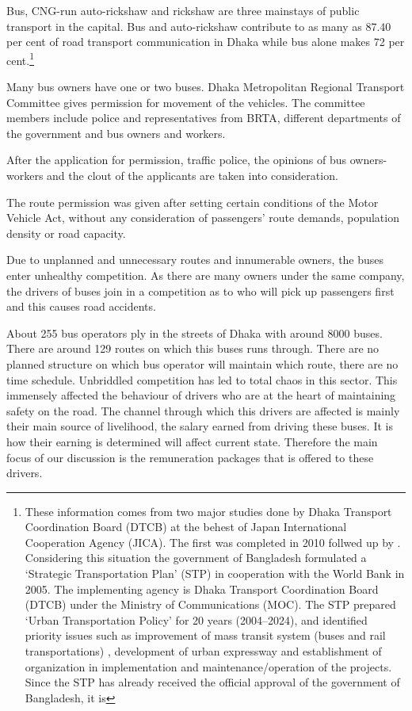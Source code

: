 \documentclass[11pt,]{article}
\begin{document}
Bus, CNG-run auto-rickshaw and rickshaw are three mainstays of public
transport in the capital. Bus and auto-rickshaw contribute to as many as
87.40 per cent of road transport communication in Dhaka while bus alone
makes 72 per cent.\footnote{These information comes from two major
  studies done by Dhaka Transport Coordination Board (DTCB) at the
  behest of Japan International Cooperation Agency (JICA). The first was
  completed in 2010 \autocite{dtcb_preparatory_2010} follwed up by
  \autocite{dtcb_preparatory_2011}. Considering this situation the
  government of Bangladesh formulated a `Strategic Transportation Plan'
  (STP) in cooperation with the World Bank in 2005. The implementing
  agency is Dhaka Transport Coordination Board (DTCB) under the Ministry
  of Communications (MOC). The STP prepared `Urban Transportation
  Policy' for 20 years (2004--2024), and identified priority issues such
  as improvement of mass transit system (buses and rail transportations)
  , development of urban expressway and establishment of organization in
  implementation and maintenance/operation of the projects. Since the
  STP has already received the official approval of the government of
  Bangladesh, it is}

Many bus owners have one or two buses. Dhaka Metropolitan Regional
Transport Committee gives permission for movement of the vehicles. The
committee members include police and representatives from BRTA,
different departments of the government and bus owners and workers.

After the application for permission, traffic police, the opinions of
bus owners-workers and the clout of the applicants are taken into
consideration.

The route permission was given after setting certain conditions of the
Motor Vehicle Act, without any consideration of passengers' route
demands, population density or road capacity.

Due to unplanned and unnecessary routes and innumerable owners, the
buses enter unhealthy competition. As there are many owners under the
same company, the drivers of buses join in a competition as to who will
pick up passengers first and this causes road accidents.

About 255 bus operators ply in the streets of Dhaka with around 8000
buses. There are around 129 routes on which this buses runs through.
There are no planned structure on which bus operator will maintain which
route, there are no time schedule. Unbriddled competition has led to
total chaos in this sector. This immensely affected the behaviour of
drivers who are at the heart of maintaining safety on the road. The
channel through which this drivers are affected is mainly their main
source of livelihood, the salary earned from driving these buses. It is
how their earning is determined will affect current state. Therefore the
main focus of our discussion is the remuneration packages that is
offered to these drivers.
\end{document}
